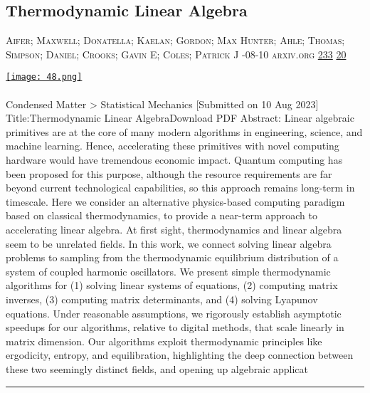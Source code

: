 \documentclass[10pt,a4paper]{article}
\begin{document}
\begin{multicols*}{2}
\begin{minipage}{\linewidth}
\subsection{Thermodynamic Linear Algebra}
\textsc{\footnotesize
{\scriptsize\faUser}\space 
Aifer; Maxwell; Donatella; Kaelan; Gordon; Max Hunter; Ahle; Thomas; Simpson; Daniel; Crooks; Gavin E; Coles; Patrick J 
{\scriptsize\faCalendar}-08-10 
{\scriptsize\faGlobe}\space 
arxiv.org 
{\scriptsize\faThumbsOUp}\space 
\href{http://news.ycombinator.com/item?id=37106789\&utm\_term=comment}{233} 
{\scriptsize\faComments}\space 
\href{http://news.ycombinator.com/item?id=37106789\&utm\_term=comment}{20} 
}
\par\medskip\noindent
\href{https://arxiv.org/abs/2308.05660?utm\_source=hackernewsletter\&utm\_medium=email\&utm\_term=learn}{
    \texttt{[image: 48.png]}
}
\end{minipage}
\paragraph{}
Condensed Matter > Statistical Mechanics
[Submitted on 10 Aug 2023]
Title:Thermodynamic Linear AlgebraDownload PDF
Abstract: Linear algebraic primitives are at the core of many modern algorithms in engineering, science, and machine learning. Hence, accelerating these primitives with novel computing hardware would have tremendous economic impact. Quantum computing has been proposed for this purpose, although the resource requirements are far beyond current technological capabilities, so this approach remains long-term in timescale. Here we consider an alternative physics-based computing paradigm based on classical thermodynamics, to provide a near-term approach to accelerating linear algebra.
At first sight, thermodynamics and linear algebra seem to be unrelated fields. In this work, we connect solving linear algebra problems to sampling from the thermodynamic equilibrium distribution of a system of coupled harmonic oscillators. We present simple thermodynamic algorithms for (1) solving linear systems of equations, (2) computing matrix inverses, (3) computing matrix determinants, and (4) solving Lyapunov equations. Under reasonable assumptions, we rigorously establish asymptotic speedups for our algorithms, relative to digital methods, that scale linearly in matrix dimension. Our algorithms exploit thermodynamic principles like ergodicity, entropy, and equilibration, highlighting the deep connection between these two seemingly distinct fields, and opening up algebraic applicat
\par\noindent\textcolor{red}{\rule{\linewidth}{0.2mm}}
\vfill
\null
\noindent\begin{minipage}{\linewidth}

\end{minipage}
\end{multicols*}
\end{document}

